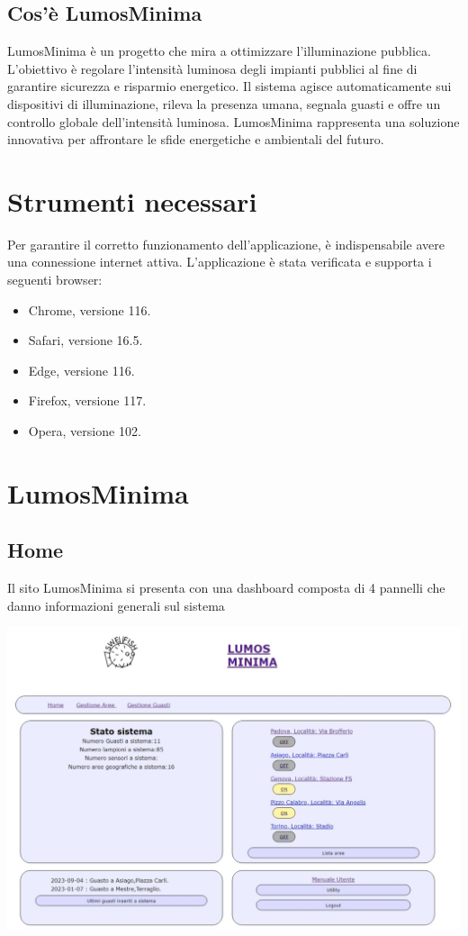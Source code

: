 \documentclass[9pt]{article}
\begin{document}
\subsection{Cos'è LumosMinima}
LumosMinima è un progetto che mira a ottimizzare l'illuminazione pubblica. L'obiettivo è regolare l'intensità luminosa degli impianti pubblici al fine di garantire sicurezza e risparmio energetico. Il sistema agisce automaticamente sui dispositivi di illuminazione, rileva la presenza umana, segnala guasti e offre un controllo globale dell'intensità luminosa. LumosMinima rappresenta una soluzione innovativa per affrontare le sfide energetiche e ambientali del futuro.

\section{Strumenti necessari}
Per garantire il corretto funzionamento dell'applicazione, è indispensabile avere una connessione internet attiva. L'applicazione è stata verificata e supporta i seguenti browser:

\begin{itemize}
	\item Chrome, versione 116.
	\item Safari, versione 16.5.
	\item Edge, versione 116.
	\item Firefox, versione 117.
	\item Opera, versione 102.
\end{itemize}
\clearpage

\section{LumosMinima}
\subsection{Home}
Il sito LumosMinima si presenta con una dashboard composta di 4 pannelli che danno informazioni generali
sul sistema

\begin{center}
	\includegraphics[scale=0.3]{LumosMinimaHome.png}
\end{center}
\end{document}
